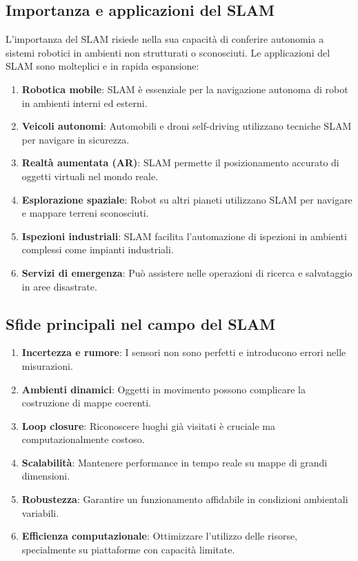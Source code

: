\documentclass[12pt,a4paper]{report}
\begin{document}
\vspace{1cm}

\subsection{Importanza e applicazioni del SLAM}

L'importanza del SLAM risiede nella sua capacità di conferire autonomia a sistemi robotici in ambienti non strutturati o sconosciuti. Le applicazioni del SLAM sono molteplici e in rapida espansione:


\begin{enumerate}
    \item \textbf{Robotica mobile}: SLAM è essenziale per la navigazione autonoma di robot in ambienti interni ed esterni.
    \item \textbf{Veicoli autonomi}: Automobili e droni self-driving utilizzano tecniche SLAM per navigare in sicurezza.
    \item \textbf{Realtà aumentata (AR)}: SLAM permette il posizionamento accurato di oggetti virtuali nel mondo reale.
    \item \textbf{Esplorazione spaziale}: Robot su altri pianeti utilizzano SLAM per navigare e mappare terreni sconosciuti.
    \item \textbf{Ispezioni industriali}: SLAM facilita l'automazione di ispezioni in ambienti complessi come impianti industriali.
    \item \textbf{Servizi di emergenza}: Può assistere nelle operazioni di ricerca e salvataggio in aree disastrate.
\end{enumerate}

\subsection{Sfide principali nel campo del SLAM}

\begin{enumerate}
    \item \textbf{Incertezza e rumore}: I sensori non sono perfetti e introducono errori nelle misurazioni.
    \item \textbf{Ambienti dinamici}: Oggetti in movimento possono complicare la costruzione di mappe coerenti.
    \item \textbf{Loop closure}: Riconoscere luoghi già visitati è cruciale ma computazionalmente costoso.
    \item \textbf{Scalabilità}: Mantenere performance in tempo reale su mappe di grandi dimensioni.
    \item \textbf{Robustezza}: Garantire un funzionamento affidabile in condizioni ambientali variabili.
    \item \textbf{Efficienza computazionale}: Ottimizzare l'utilizzo delle risorse, specialmente su piattaforme con capacità limitate.
\end{enumerate}
\end{document}
